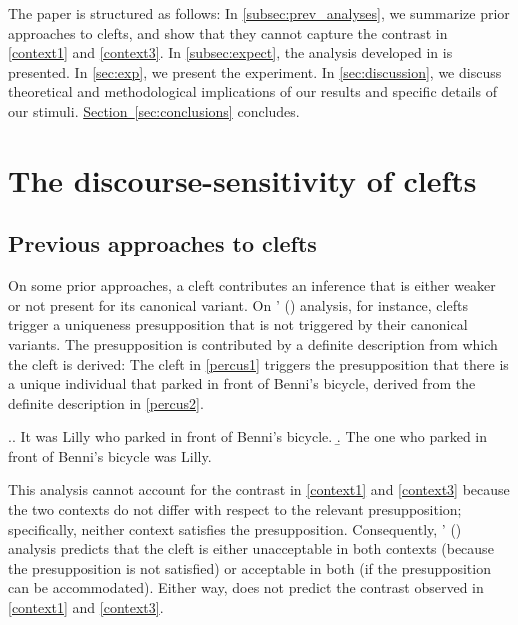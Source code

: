 \documentclass{salt}
\begin{document}
The paper is structured as follows: In \autoref{subsec:prev_analyses}, we summarize prior approaches to clefts, and show that they cannot capture the contrast in \ref{context1} and \ref{context3}. In \autoref{subsec:expect}, the analysis developed in \cite{tonnis_2021} is presented. In \autoref{sec:exp}, we present the experiment. In \autoref{sec:discussion}, we discuss theoretical and methodological implications of our results and specific details of our stimuli. \hyperref[sec:conclusions]{Section~\ref*{sec:conclusions}} concludes.


\section{The discourse-sensitivity of clefts}
\label{sec:background}


\subsection{Previous approaches to clefts}
\label{subsec:prev_analyses}

On some prior approaches, a cleft contributes an inference that is either weaker or not present for its canonical variant. On \citeauthor{percus_1997}' (\citeyear{percus_1997})  analysis, for instance, clefts trigger a uniqueness presupposition that is not triggered by their canonical variants. The presupposition is contributed by a definite description from which the cleft is derived: The cleft in \ref{percus1} triggers the presupposition that there is a unique individual that parked in front of Benni's bicycle, derived from the definite description in \ref{percus2}. 

\ex.\a.\label{percus1} It was Lilly who parked in front of Benni's bicycle.
	\b.\label{percus2} The one who parked in front of Benni's bicycle was Lilly.
	
This analysis cannot account for the contrast in \ref{context1} and \ref{context3} because the two contexts do not differ with respect to the relevant presupposition; specifically, neither context satisfies the presupposition. Consequently, \citeauthor{percus_1997}' (\citeyear{percus_1997})  analysis predicts that the cleft is either unacceptable in both contexts (because the presupposition is not satisfied) or acceptable in both (if the presupposition can be accommodated). Either way, \cite{percus_1997} does not predict the contrast observed in \ref{context1} and \ref{context3}.
\end{document}
